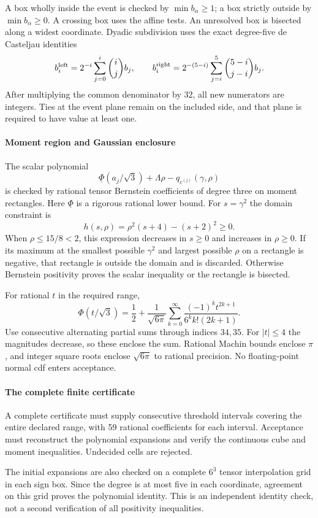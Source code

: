 A box wholly inside the event is checked by $\min b_\alpha\ge1$; a box
strictly outside by $\min b_\alpha\ge0$. A crossing box uses the affine
tests. An unresolved box is bisected along a widest coordinate. Dyadic
subdivision uses the exact degree-five de Casteljau identities
\[
 b_i^{\rm left}=2^{-i}\sum_{j=0}^i\binom ij b_j,
 \qquad
 b_i^{\rm right}=2^{-(5-i)}\sum_{j=i}^5\binom{5-i}{j-i}b_j.
\]
After multiplying the common denominator by $32$, all new numerators are
integers. Ties at the event plane remain on the included side, and that
plane is required to have value at least one.

\paragraph{Moment region and Gaussian enclosure}
The scalar polynomial
\[
 \underline\Phi(a_j/\sqrt3)+\Lambda\rho-q_{c^{(j)}}(\gamma,\rho)
\]
is checked by rational tensor Bernstein coefficients of degree three on
moment rectangles. Here $\underline\Phi$ is a rigorous rational lower bound.
For $s=\gamma^2$ the domain constraint is
\[
 h(s,\rho)=\rho^2(s+4)-(s+2)^2\ge0.
\]
When $\rho\le15/8<2$, this expression decreases in $s\ge0$ and increases
in $\rho\ge0$. If its maximum at the smallest possible $\gamma^2$ and
largest possible $\rho$ on a rectangle is negative, that rectangle is
outside the domain and is discarded. Otherwise Bernstein positivity proves
the scalar inequality or the rectangle is bisected.

For rational $t$ in the required range,
\[
 \Phi(t/\sqrt3)=\frac12+\frac1{\sqrt{6\pi}}
 \sum_{k=0}^{\infty}\frac{(-1)^k t^{2k+1}}{6^k k!(2k+1)}.
\]
Use consecutive alternating partial sums through indices
$34,35$. For $|t|\le4$ the magnitudes decrease, so these enclose the sum.
Rational Machin bounds enclose $\pi$, and integer square roots enclose
$\sqrt{6\pi}$ to rational precision. No floating-point normal cdf enters
acceptance.

\paragraph{The complete finite certificate}
A complete certificate must supply consecutive threshold intervals covering the entire declared range, with 59 rational coefficients for each interval. Acceptance must reconstruct the polynomial expansions and verify the continuous cube and moment inequalities. Undecided cells
are rejected.

The initial expansions are also checked on a complete \(6^3\)
tensor interpolation grid in each sign box. Since the degree is at
most five in each coordinate, agreement on this grid proves the
polynomial identity. This is an independent identity check, not a
second verification of all positivity inequalities.


